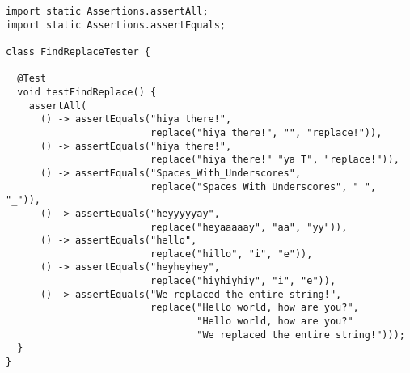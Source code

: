 
\begin{lstlisting}[language=MyJava]
import static Assertions.assertAll;
import static Assertions.assertEquals;

class FindReplaceTester {

  @Test
  void testFindReplace() {
    assertAll(
      () -> assertEquals("hiya there!",
                         replace("hiya there!", "", "replace!")),
      () -> assertEquals("hiya there!",
                         replace("hiya there!" "ya T", "replace!")),
      () -> assertEquals("Spaces_With_Underscores",
                         replace("Spaces With Underscores", " ", "_")),
      () -> assertEquals("heyyyyyay",
                         replace("heyaaaaay", "aa", "yy")),
      () -> assertEquals("hello",
                         replace("hillo", "i", "e")),
      () -> assertEquals("heyheyhey",
                         replace("hiyhiyhiy", "i", "e")),
      () -> assertEquals("We replaced the entire string!",
                         replace("Hello world, how are you?", 
                                 "Hello world, how are you?" 
                                 "We replaced the entire string!")));
  }
}
\end{lstlisting}

